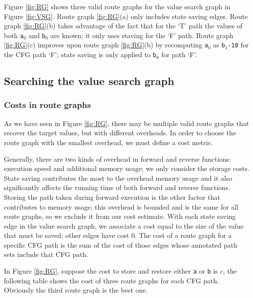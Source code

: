 Figure \ref{fig:RG} shows three valid route graphs for the value search graph in Figure \ref{fig:VSG}. 
Route graph \ref{fig:RG}(a) only includes state saving edges. 
Route graph \ref{fig:RG}(b) takes advantage of the fact that for the `T' path the values of both \texttt{a$_0$} and \texttt{b$_0$} are known; it only uses staving for the `F' path. 
Route graph \ref{fig:RG}(c) improves upon route graph \ref{fig:RG}(b) by recomputing \texttt{a$_0$} as \texttt{b$_1$-10} for the CFG path `F'; state saving is only applied to \texttt{b$_0$} for path `F'.



\subsection{Searching the value search graph}

\subsubsection{Costs in route graphs}
As we have seen in Figure \ref{fig:RG}, there may be multiple valid route graphs that recover the target values, but with different overheads. 
In order to choose the route graph with the smallest overhead, we must define a cost metric.

Generally, there are two kinds of overhead in forward and reverse functions: execution speed and additional memory usage; we only consider the storage costs.
State saving contributes the most to the overhead memory usage and it also significantly affects the running time of both forward and reverse functions. 
Storing the path taken during forward execution is the other factor that contributes to memory usage; this overhead is bounded and is the same for all route graphs, so we exclude it from our cost estimate. 
With each state saving edge in the value search graph, we associate a cost equal to the size of the value that must be saved; other edges have cost 0.
The cost of a route graph for a specific CFG path is the sum of the cost of those edges whose annotated path sets include that CFG path.

In Figure \ref{fig:RG}, suppose the cost to store and restore either \texttt{a} or \texttt{b} is $c$, the following table shows the cost of three route graphs for each CFG path.
Obviously the third route graph is the best one.

